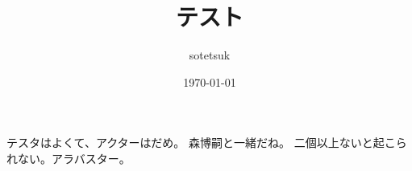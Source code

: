 \documentclass{jsarticle}
\title{テスト}
\author{sotetsuk}
\date{\today}
\begin{document}
\maketitle

テスタはよくて、アクターはだめ。
森博嗣と一緒だね。
二個以上ないと起こられない。アラバスター。
\end{document}
